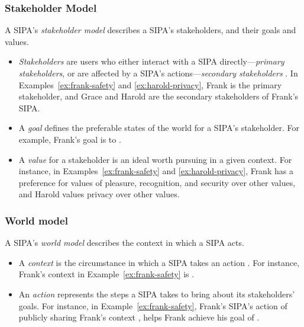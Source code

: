 \subsubsection{Stakeholder Model}
A SIPA's \emph{stakeholder model} describes a SIPA's stakeholders, and their goals and values. 

\begin{itemize}
\item \emph{Stakeholders} are users who either interact with a SIPA directly---\emph{primary stakeholders}, or are affected by a SIPA's actions---\emph{secondary stakeholders} \citep{Friedman-2008-value-sensitive-design}. In Examples~\ref{ex:frank-safety} and \ref{ex:harold-privacy}, Frank is the primary stakeholder, and Grace and Harold are the secondary stakeholders of Frank's \locationapp SIPA.
\item A \emph{goal} defines the preferable states of the world for a SIPA's stakeholder. For example, Frank's goal is to . 
\item A \emph{value} for a stakeholder is an ideal worth pursuing in a given context. For instance, in Examples~\ref{ex:frank-safety} and \ref{ex:harold-privacy}, Frank has a preference for values of pleasure, recognition, and security over other values, and Harold values privacy over other values. 
\end{itemize}

\subsubsection{World model}
A SIPA's \emph{world model} describes the context in which a SIPA acts. 
\begin{itemize}
\item A \emph{context} is the circumstance in which a SIPA takes an action \citep{Murukannaiah-AAMAS14-Xipho}. For instance, Frank's context in Example~\ref{ex:frank-safety} is .
\item An \emph{action} represents the steps a SIPA takes to bring about its stakeholders' goals. 
For instance, in Example~\ref{ex:frank-safety},  Frank's \locationapp SIPA's action of publicly sharing Frank's context , helps Frank achieve his goal of . 
\end{itemize}

